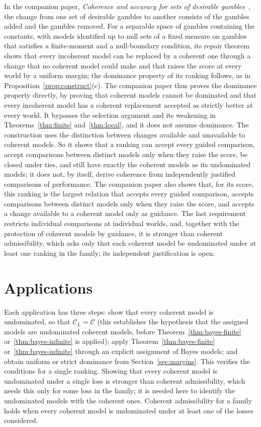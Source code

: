 \documentclass[11pt]{article}
\theoremstyle{definition}
\theoremstyle{remark}
\newcommand{\C}{\mathcal C}
\begin{document}
In the companion paper, \emph{Coherence and accuracy for sets of desirable gambles}~\cite{KCM}, the change from one set of desirable gambles to another consists of the gambles added and the gambles removed. For a separable space of gambles containing the constants, with models identified up to null sets of a fixed measure on gambles that satisfies a finite-moment and a null-boundary condition, its repair theorem shows that every incoherent model can be replaced by a coherent one through a change that no coherent model could make and that raises the score at every world by a uniform margin; the dominance property of its ranking follows, as in Proposition~\ref{prop:construct}(c). The companion paper thus proves the dominance property directly, by proving that coherent models cannot be dominated and that every incoherent model has a coherent replacement accepted as strictly better at every world. It bypasses the selection argument and its weakening in Theorems~\ref{thm:finite} and~\ref{thm:local}, and it does not assume dominance. The construction uses the distinction between changes available and unavailable to coherent models. So it shows that a ranking can accept every guided comparison, accept comparisons between distinct models only when they raise the score, be closed under ties, and still have exactly the coherent models as its undominated models; it does not, by itself, derive coherence from independently justified comparisons of performance. The companion paper also shows that, for its score, this ranking is the largest relation that accepts every guided comparison, accepts comparisons between distinct models only when they raise the score, and accepts a change available to a coherent model only as guidance. The last requirement restricts individual comparisons at individual worlds, and, together with the protection of coherent models by guidance, it is stronger than coherent admissibility, which asks only that each coherent model be undominated under at least one ranking in the family; its independent justification is open.

\section{Applications}\label{sec:apps}
Each application has three steps: show that every coherent model is undominated, so that $\C_L=\C$ (this establishes the hypothesis that the assigned models are undominated coherent models, before Theorem~\ref{thm:bayes-finite} or~\ref{thm:bayes-infinite} is applied); apply Theorem~\ref{thm:bayes-finite} or~\ref{thm:bayes-infinite} through an explicit assignment of Bayes models; and obtain uniform or strict dominance from Section~\ref{sec:margins}. This verifies the conditions for a single ranking. Showing that every coherent model is undominated under a single loss is stronger than coherent admissibility, which needs this only for some loss in the family; it is needed here to identify the undominated models with the coherent ones. Coherent admissibility for a family holds when every coherent model is undominated under at least one of the losses considered.
\end{document}
